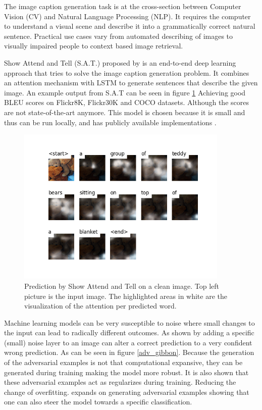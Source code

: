 The image caption generation task is at the cross-section between Computer Vision (CV) and Natural Language Processing (NLP). It requires the computer to understand a visual scene and describe it into a grammatically correct natural sentence. Practical use cases vary from automated describing of images to visually impaired people \cite{mazzoni_2019} to context based image retrieval.

Show Attend and Tell (S.A.T.) proposed by \citeauthor{xu2016show} is an end-to-end deep learning approach that tries to solve the image caption generation problem. It combines an attention mechanism with LSTM to generate sentences that describe the given image. An example output from S.A.T can be seen in figure \ref{sat_example} Achieving good BLEU scores on Flickr8K, Flickr30K\cite{Flickr8k} and COCO\cite{lin2015microsoft} datasets. Although the scores are not state-of-the-art\cite{DBLP:journals/corr/abs-2107-06912} anymore. This model is chosen because it is small and thus can be run locally, and has publicly available implementations \cite{sgrvinod}.

\begin{figure}[ht]
    \centering
    \includegraphics[width=0.9\textwidth]{figures/caption_teddy_normal.png} %
    \caption{Prediction by Show Attend and Tell on a clean image. \newline Top left picture is the input image. The highlighted areas in white are the visualization of the attention per predicted word.}
    \label{sat_example}
\end{figure}

Machine learning models can be very susceptible to noise where small changes to the input can lead to radically different outcomes. As shown by \citeauthor{goodfellow2015explaining} adding a specific (small) noise layer to an image can alter a correct prediction to a very confident wrong prediction. As can be seen in figure \ref{adv_gibbon}. Because the generation of the adversarial examples is not that computational expansive, they can be generated during training making the model more robust. It is also shown that these adversarial examples act as regularizes during training. Reducing the change of overfitting. \citeauthor{Kurakin} expands on generating adversarial examples showing that one can also steer the model towards a specific classification.

